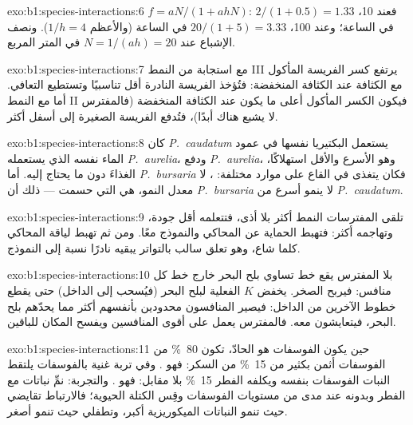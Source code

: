\begin{solution}{exo:b1:species-interactions:6}
$f = aN/(1 + ahN)$: فعند 10، $2/(1 + 0.5) = 1.33$ في الساعة؛ وعند 100،
$20/(1 + 5) = 3.33$ في الساعة (والأعظم $1/h = 4$). ونصف الإشباع عند
$N = 1/(ah) = 20$ في المتر المربع.
\end{solution}

\begin{solution}{exo:b1:species-interactions:7}
مع استجابة من النمط III يرتفع كسر الفريسة المأكول مع
الكثافة عند الكثافة المنخفضة: فتُؤخذ الفريسة النادرة أقل تناسبيًا
وتستطيع التعافي. أما مع النمط II فيكون الكسر المأكول أعلى ما يكون عند
الكثافة المنخفضة (فالمفترس لا يشبع هناك أبدًا)، فتُدفع 
الفريسة الصغيرة إلى أسفل أكثر.
\end{solution}

\begin{solution}{exo:b1:species-interactions:8}
كان \emph{P.~caudatum} يستعمل البكتيريا نفسها في عمود الماء نفسه
الذي يستعمله \emph{P.~aurelia}، ودفع \emph{P.~aurelia}، وهو الأسرع
والأقل استهلاكًا، الغذاءَ دون ما يحتاج إليه. أما \emph{P.~bursaria} فكان
يتغذى في القاع على موارد مختلفة: ، لا معدل النمو، هي التي حسمت
--- ذلك أن \emph{P.~bursaria} لا ينمو أسرع من \emph{P.~caudatum}.
\end{solution}

\begin{solution}{exo:b1:species-interactions:9}
تلقى المفترسات النمط أكثر بلا أذى، فتتعلمه أقل
جودة، وتهاجمه أكثر: فتهبط الحماية عن المحاكي والنموذج معًا.
ومن ثم تهبط لياقة المحاكي كلما شاع، وهو تعلق سالب
بالتواتر يبقيه نادرًا نسبة إلى النموذج.
\end{solution}

\begin{solution}{exo:b1:species-interactions:10}
بلا المفترس يقع خط تساوي بلح البحر خارج خط كل
منافس: فيربح الصخر.  يخفض $K$ الفعلية لبلح البحر
(فيُسحب  إلى الداخل) حتى يقطع
خطوط الآخرين من الداخل: فيصير المنافسون محدودين
بأنفسهم أكثر مما يحدّهم بلح البحر، فيتعايشون معه. فالمفترس
يعمل على أقوى المنافسين ويفسح المكان للباقين.
\end{solution}

\begin{solution}{exo:b1:species-interactions:11}
حين يكون الفوسفات هو الحادّ، تكون \qty{80}{\%} من الفوسفات أثمن
بكثير من \qty{15}{\%} من السكر: فهو . وفي تربة غنية
بالفوسفات يلتقط النبات الفوسفات بنفسه ويكلفه الفطر
\qty{15}{\%} بلا مقابل: فهو . والتجربة: نمِّ نباتات
مع الفطر وبدونه عند مدى من مستويات الفوسفات
وقِس الكتلة الحيوية؛ فالارتباط تقايضي حيث تنمو النباتات
الميكوريزية أكبر، وتطفلي حيث تنمو أصغر.
\end{solution}

